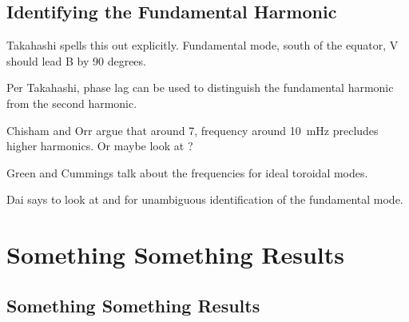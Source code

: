 \subsection{Identifying the Fundamental Harmonic}

Takahashi\cite{takahashi_2013} spells this out explicitly. Fundamental mode, south of the equator, V should lead B by 90 degrees. 

Per Takahashi\cite{takahashi_2011}, phase lag can be used to distinguish the fundamental harmonic from the second harmonic. 

Chisham and Orr\cite{chisham_1991} argue that around \SI{7}{\RE}, frequency around \SI{10}{\mHz} precludes higher harmonics. Or maybe look at \cite{green_1985}?

Green\cite{green_1979} and Cummings\cite{cummings_1969} talk about the frequencies for ideal toroidal modes. 

Dai\cite{dai_2015} says to look at \cite{takahashi_2011} and \cite{dai_2013} for unambiguous identification of the fundamental mode. 

\section{Something Something Results}

\subsection{Something Something Results}










